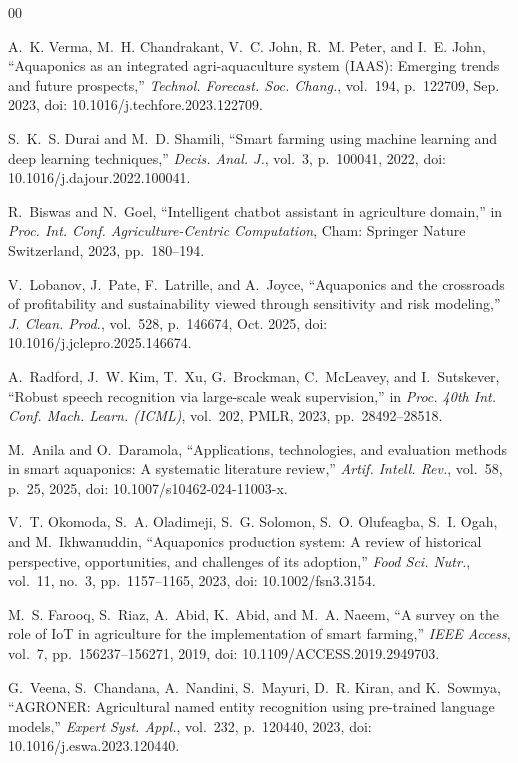 \documentclass[conference]{IEEEtran}
\begin{document}
\begin{thebibliography}{00}

A.~K. Verma, M.~H. Chandrakant, V.~C. John, R.~M. Peter, and I.~E. John,
``Aquaponics as an integrated agri-aquaculture system ({IAAS}): Emerging
trends and future prospects,''
\textit{Technol. Forecast. Soc. Chang.},
vol.~194, p.~122709, Sep. 2023,
doi: 10.1016/j.techfore.2023.122709.

S.~K.~S. Durai and M.~D. Shamili,
``Smart farming using machine learning and deep learning techniques,''
\textit{Decis. Anal. J.},
vol.~3, p.~100041, 2022,
doi: 10.1016/j.dajour.2022.100041.

R.~Biswas and N.~Goel,
``Intelligent chatbot assistant in agriculture domain,''
in \textit{Proc. Int. Conf. Agriculture-Centric Computation},
Cham: Springer Nature Switzerland, 2023, pp.~180--194.

V.~Lobanov, J.~Pate, F.~Latrille, and A.~Joyce,
``Aquaponics and the crossroads of profitability and sustainability
viewed through sensitivity and risk modeling,''
\textit{J. Clean. Prod.},
vol.~528, p.~146674, Oct. 2025,
doi: 10.1016/j.jclepro.2025.146674.

A.~Radford, J.~W. Kim, T.~Xu, G.~Brockman, C.~McLeavey,
and I.~Sutskever,
``Robust speech recognition via large-scale weak supervision,''
in \textit{Proc. 40th Int. Conf. Mach. Learn. (ICML)},
vol.~202, PMLR, 2023, pp.~28492--28518.

M.~Anila and O.~Daramola,
``Applications, technologies, and evaluation methods in smart aquaponics:
A systematic literature review,''
\textit{Artif. Intell. Rev.},
vol.~58, p.~25, 2025,
doi: 10.1007/s10462-024-11003-x.

V.~T. Okomoda, S.~A. Oladimeji, S.~G. Solomon, S.~O. Olufeagba,
S.~I. Ogah, and M.~Ikhwanuddin,
``Aquaponics production system: A review of historical perspective,
opportunities, and challenges of its adoption,''
\textit{Food Sci. Nutr.},
vol.~11, no.~3, pp.~1157--1165, 2023,
doi: 10.1002/fsn3.3154.

M.~S. Farooq, S.~Riaz, A.~Abid, K.~Abid, and M.~A. Naeem,
``A survey on the role of {IoT} in agriculture for the implementation
of smart farming,''
\textit{IEEE Access},
vol.~7, pp.~156237--156271, 2019,
doi: 10.1109/ACCESS.2019.2949703.

G.~Veena, S.~Chandana, A.~Nandini, S.~Mayuri, D.~R. Kiran,
and K.~Sowmya,
``AGRONER: Agricultural named entity recognition using pre-trained
language models,''
\textit{Expert Syst. Appl.},
vol.~232, p.~120440, 2023,
doi: 10.1016/j.eswa.2023.120440.


\end{thebibliography}
\end{document}
